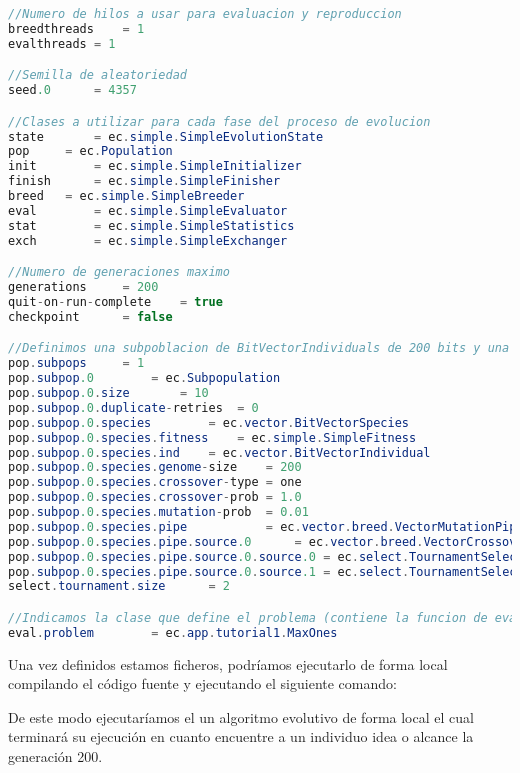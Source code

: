 \begin{lstlisting}[language=Java]
//Numero de hilos a usar para evaluacion y reproduccion
breedthreads	= 1
evalthreads	= 1

//Semilla de aleatoriedad
seed.0		= 4357

//Clases a utilizar para cada fase del proceso de evolucion
state		= ec.simple.SimpleEvolutionState
pop		= ec.Population
init		= ec.simple.SimpleInitializer
finish		= ec.simple.SimpleFinisher
breed	= ec.simple.SimpleBreeder
eval		= ec.simple.SimpleEvaluator
stat		= ec.simple.SimpleStatistics
exch		= ec.simple.SimpleExchanger

//Numero de generaciones maximo
generations		= 200
quit-on-run-complete	= true
checkpoint		= false

//Definimos una subpoblacion de BitVectorIndividuals de 200 bits y una reproduccion con seleccion por torneo de 2 individuos
pop.subpops		= 1
pop.subpop.0		= ec.Subpopulation
pop.subpop.0.size 		= 10
pop.subpop.0.duplicate-retries 	= 0
pop.subpop.0.species 		= ec.vector.BitVectorSpecies
pop.subpop.0.species.fitness 	= ec.simple.SimpleFitness
pop.subpop.0.species.ind	= ec.vector.BitVectorIndividual
pop.subpop.0.species.genome-size	= 200
pop.subpop.0.species.crossover-type	= one
pop.subpop.0.species.crossover-prob	= 1.0
pop.subpop.0.species.mutation-prob	= 0.01
pop.subpop.0.species.pipe			= ec.vector.breed.VectorMutationPipeline
pop.subpop.0.species.pipe.source.0		= ec.vector.breed.VectorCrossoverPipeline
pop.subpop.0.species.pipe.source.0.source.0	= ec.select.TournamentSelection
pop.subpop.0.species.pipe.source.0.source.1	= ec.select.TournamentSelection
select.tournament.size		= 2

//Indicamos la clase que define el problema (contiene la funcion de evaluacion)
eval.problem		= ec.app.tutorial1.MaxOnes
\end{lstlisting}

Una vez definidos estamos ficheros, podríamos ejecutarlo de forma local compilando el código fuente y ejecutando el siguiente comando:


De este modo ejecutaríamos el un algoritmo evolutivo de forma local el cual terminar\'a su ejecución en cuanto encuentre a un individuo idea o alcance la generación 200.

